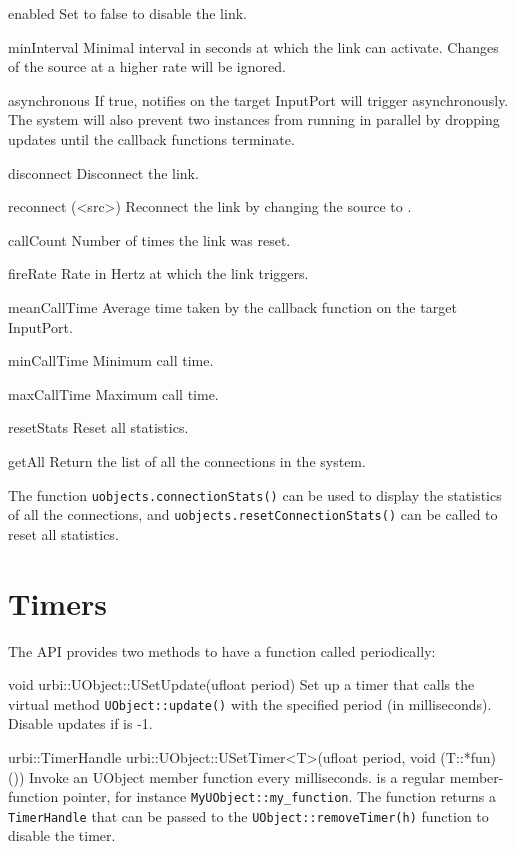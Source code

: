\begin{urbiscriptapi}
\item[enabled]
  Set to false to disable the link.
\item[minInterval]
  Minimal interval in seconds at which the link can activate. Changes of the
  source at a higher rate will be ignored.
\item[asynchronous]
  If true, notifies on the target InputPort will trigger asynchronously. The
  system will also prevent two instances from running in parallel by dropping
  updates until the callback functions terminate.
\item[disconnect]
  Disconnect the link.
\item[reconnect](<src>)
  Reconnect the link by changing the source to .
\item[callCount]
  Number of times the link was reset.
\item[fireRate]
  Rate in Hertz at which the link triggers.
\item[meanCallTime]
  Average time taken by the callback function on the target InputPort.
\item[minCallTime]
  Minimum call time.
\item[maxCallTime]
  Maximum call time.
\item[resetStats]
  Reset all statistics.
\item[getAll]
  Return the list of all the connections in the system.
\end{urbiscriptapi}


The function \lstinline|uobjects.connectionStats()| can be used to display
the statistics of all the connections, and
\lstinline|uobjects.resetConnectionStats()| can be called to reset all
statistics.

\section{Timers}
\label{sec:uob:timers}

The API provides two methods to have a function called periodically:
\begin{cxxapi}
\item[void urbi::UObject::USetUpdate(ufloat period)] Set up a timer that
  calls the virtual method \lstinline{UObject::update()} with the specified
  period (in milliseconds).  Disable updates if  is -1.

\item[urbi::TimerHandle urbi::UObject::USetTimer<T>(ufloat period, void (T::*fun)())]
  Invoke an UObject member function  every 
  milliseconds.   is a regular member-function pointer, for
  instance \lstinline|MyUObject::my_function|.
  The function returns a \lstinline|TimerHandle| that can be passed to the
  \lstinline|UObject::removeTimer(h)| function to disable the timer.
\end{cxxapi}

